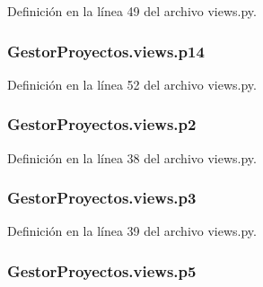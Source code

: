 Definición en la línea 49 del archivo views.\+py.

\subsubsection[{\texorpdfstring{p14}{p14}}]{\setlength{\rightskip}{0pt plus 5cm}Gestor\+Proyectos.\+views.\+p14}\hypertarget{namespace_gestor_proyectos_1_1views_aab5eb0361c48c88c343bf729fac64185}{}\label{namespace_gestor_proyectos_1_1views_aab5eb0361c48c88c343bf729fac64185}


Definición en la línea 52 del archivo views.\+py.

\subsubsection[{\texorpdfstring{p2}{p2}}]{\setlength{\rightskip}{0pt plus 5cm}Gestor\+Proyectos.\+views.\+p2}\hypertarget{namespace_gestor_proyectos_1_1views_ab05e5db5fffd326d820cfd2558aba30a}{}\label{namespace_gestor_proyectos_1_1views_ab05e5db5fffd326d820cfd2558aba30a}


Definición en la línea 38 del archivo views.\+py.

\subsubsection[{\texorpdfstring{p3}{p3}}]{\setlength{\rightskip}{0pt plus 5cm}Gestor\+Proyectos.\+views.\+p3}\hypertarget{namespace_gestor_proyectos_1_1views_a8846e04883a7133a81cba7475dd8f35f}{}\label{namespace_gestor_proyectos_1_1views_a8846e04883a7133a81cba7475dd8f35f}


Definición en la línea 39 del archivo views.\+py.

\subsubsection[{\texorpdfstring{p5}{p5}}]{\setlength{\rightskip}{0pt plus 5cm}Gestor\+Proyectos.\+views.\+p5}\hypertarget{namespace_gestor_proyectos_1_1views_a706c047c6c24dc91d4c27984323da575}{}\label{namespace_gestor_proyectos_1_1views_a706c047c6c24dc91d4c27984323da575}


